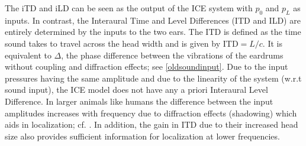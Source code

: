 The iTD and iLD can be seen as the output of the ICE system with $p_0$ and $p_L$ as inputs.
In contrast, the Interaural Time and Level Differences (ITD and ILD) are entirely determined 
by the inputs to the two ears. The ITD is defined as the time sound takes to travel across
the head width and is given by ITD$=L/c$. It is equivalent to $\Delta$, the phase difference
between the vibrations of the eardrums without coupling and diffraction effects; see \eqref{oldsoundinput}. Due to the 
input pressures having the same amplitude and due to the linearity of the system (w.r.t sound input), the ICE model does not have any 
a priori Interaural Level Difference. In larger animals
like humans the difference between the input amplitudes increases with frequency due to 
diffraction effects (shadowing) which aids in localization; cf. \cite[p~.154]{fletcheracoustic}. In addition, the gain in ITD due
to their increased head size also provides sufficient information for localization at lower frequencies.

